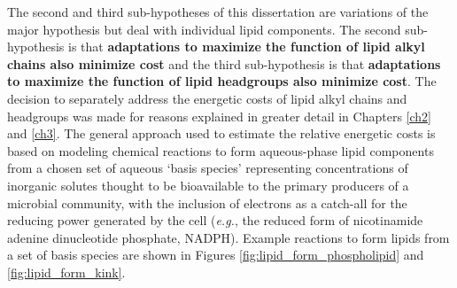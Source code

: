The second and third sub-hypotheses of this dissertation are variations of the major hypothesis but deal with individual lipid components. The second sub-hypothesis is that \textbf{adaptations to maximize the function of lipid alkyl chains also minimize cost} and the third sub-hypothesis is that \textbf{adaptations to maximize the function of lipid headgroups also minimize cost}. The decision to separately address the energetic costs of lipid alkyl chains and headgroups was made for reasons explained in greater detail in Chapters \ref{ch2} and \ref{ch3}. The general approach used to estimate the relative energetic costs is based on modeling chemical reactions to form aqueous-phase lipid components from a chosen set of aqueous `basis species' representing concentrations of inorganic solutes thought to be bioavailable to the primary producers of a microbial community, with the inclusion of electrons as a catch-all for the reducing power generated by the cell (\textit{e.g.}, the reduced form of nicotinamide adenine dinucleotide phosphate, NADPH). Example reactions to form lipids from a set of basis species are shown in Figures \ref{fig:lipid_form_phospholipid} and \ref{fig:lipid_form_kink}.
